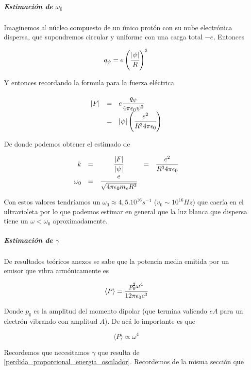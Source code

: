 \documentclass[a4paper,spanish]{article}
\numberwithin{equation}{section}
\begin{document}
\subparagraph*{Estimaci\'on de $\omega_0$}
Imaginemos al n\'ucleo compuesto de un \'unico prot\'on con su nube electr\'onica dispersa, que supondremos circular y uniforme con una carga total $-e$. Entonces

\[
 q_{\psi}= e \left(\cfrac{\vert{\psi}\vert}{R}\right)^3
\]

Y entonces recordando la formula para la fuerza el\'ectrica

\[
\begin{array}{rcl}
\vert{F}\vert & = & e \cfrac{q_{\psi}}{4 \pi \epsilon_0 {\psi}^2} \\
& = & \vert{\psi}\vert \left(\cfrac{e^2}{R^3 4 \pi \epsilon_0}\right)
\end{array}
\] 

De donde podemos obtener el estimado de

\begin{equation}
\begin{array}{rcccl}
	k & = & \cfrac{\vert{F}\vert}							{\vert{\psi}\vert} & = & \cfrac{e^2}{R^{3} 4 \pi 			\epsilon_0 } \\
	\omega_0 & = & \cfrac{e}{\sqrt{4 \pi \epsilon_0 m_e R^3}}
	\end{array}
	\label{frecuencia_dispersion_luz}
\end{equation}
	

Con estos valores tendr\'iamos un $\omega_0 \approx 4,5.10^{16} s^{-1}$ ($v_0 \sim 10^{16} Hz$) que caer\'ia en el ultravioleta por lo que podemos estimar en general que la luz blanca que dispersa tiene un $\omega < \omega_0$ aproximadamente. 

\subparagraph*{Estimaci\'on de $\gamma$}
De resultados te\'oricos anexos se sabe que la potencia media emitida por un emisor que vibra arm\'onicamente es

\begin{equation}
\langle{P}\rangle=\cfrac{p_0 ^2 \omega^4}{12\pi\epsilon_0 c^3}
\end{equation}

Donde $p_0$ es la amplitud del momento dipolar (que termina valiendo $eA$ para un electr\'on vibrando con amplitud $A$). De ac\'a lo importante es que

\begin{equation}
\langle{P}\rangle \propto \omega^4 
\label{potencia_dispersion_luz}
\end{equation}

Recordemos que necesitamos $\gamma$ que resulta de \ref{perdida_proporcional_energia_oscilador}. Recordemos de la misma secci\'on que 
\end{document}
